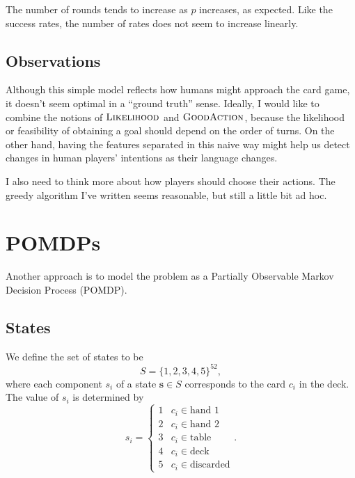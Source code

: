 \documentclass[11pt]{article}
\newcommand{\lkhd}{\textsc{Likelihood}}
\newcommand{\goodaction}{\textsc{GoodAction}}
\begin{document}
The number of rounds tends to increase as $p$ increases, as expected. Like the success rates, the number of rates does not seem to increase linearly.

\subsection{Observations}

Although this simple model reflects how humans might approach the card game, it doesn't seem optimal in a ``ground truth'' sense. Ideally, I would like to combine the notions of $\lkhd$ and $\goodaction$, because the likelihood or feasibility of obtaining a goal should depend on the order of turns. On the other hand, having the features separated in this naive way might help us detect changes in human players' intentions as their language changes.

I also need to think more about how players should choose their actions. The greedy algorithm I've written seems reasonable, but still a little bit ad hoc.

\section{POMDPs}

Another approach is to model the problem as a Partially Observable Markov Decision Process (POMDP).

\subsection{States}

We define the set of states to be
\begin{equation}
  S = \{1, 2, 3, 4, 5\}^{52},
\label{eq:states} \end{equation}
where each component $s_i$ of a state $\mathbf{s} \in S$ corresponds to the card $c_i$ in the deck. The value of $s_i$ is determined by
\begin{equation}
  s_i = \begin{cases}
    1 & c_i \in \text{hand 1} \\
    2 & c_i \in \text{hand 2} \\
    3 & c_i \in \text{table} \\
    4 & c_i \in \text{deck} \\
    5 & c_i \in \text{discarded}
  \end{cases}.
\label{eq:statecomponents}\end{equation}
\end{document}
